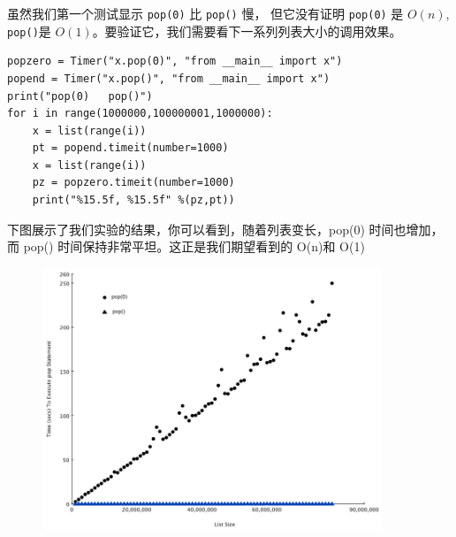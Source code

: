 %
%

\begin{frame}[fragile]\ft{\subsecname}

虽然我们第一个测试显示 \lstinline|pop(0)| 比 \lstinline|pop()| 慢， 但它没有证明 \lstinline|pop(0)| 是 $O(n)$, \lstinline|pop()|是 $O(1)$。要验证它，我们需要看下一系列列表大小的调用效果。
\begin{lstlisting}
popzero = Timer("x.pop(0)", "from __main__ import x") 
popend = Timer("x.pop()", "from __main__ import x")
print("pop(0)   pop()")
for i in range(1000000,100000001,1000000):
    x = list(range(i))
    pt = popend.timeit(number=1000)
    x = list(range(i))
    pz = popzero.timeit(number=1000)
    print("%15.5f, %15.5f" %(pz,pt))
\end{lstlisting}
\end{frame}

\begin{frame}[fragile]\ft{\subsecname}

下图展示了我们实验的结果，你可以看到，随着列表变长，pop(0) 时间也增加，而 pop() 时间保持非常平坦。这正是我们期望看到的 O(n)和 O(1)

\begin{figure}
\centering
\includegraphics[width=4in]{images/poptime.png}
\end{figure}
\end{frame}

